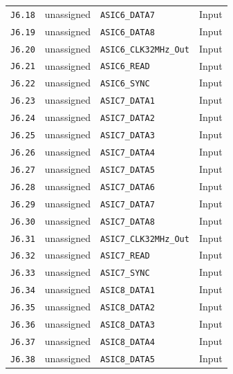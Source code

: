 \documentclass[11pt,a4paper]{article}
\begin{document}
\begin{longtable}{@{}P{19mm}P{36mm}P{78mm}P{33mm}@{}}
\nolinkurl{J6.18} & \textcolor{muted}{unassigned} & \nolinkurl{ASIC6_DATA7} & Input \\
\nolinkurl{J6.19} & \textcolor{muted}{unassigned} & \nolinkurl{ASIC6_DATA8} & Input \\
\nolinkurl{J6.20} & \textcolor{muted}{unassigned} & \nolinkurl{ASIC6_CLK32MHz_Out} & Input \\
\nolinkurl{J6.21} & \textcolor{muted}{unassigned} & \nolinkurl{ASIC6_READ} & Input \\
\nolinkurl{J6.22} & \textcolor{muted}{unassigned} & \nolinkurl{ASIC6_SYNC} & Input \\
\nolinkurl{J6.23} & \textcolor{muted}{unassigned} & \nolinkurl{ASIC7_DATA1} & Input \\
\nolinkurl{J6.24} & \textcolor{muted}{unassigned} & \nolinkurl{ASIC7_DATA2} & Input \\
\nolinkurl{J6.25} & \textcolor{muted}{unassigned} & \nolinkurl{ASIC7_DATA3} & Input \\
\nolinkurl{J6.26} & \textcolor{muted}{unassigned} & \nolinkurl{ASIC7_DATA4} & Input \\
\nolinkurl{J6.27} & \textcolor{muted}{unassigned} & \nolinkurl{ASIC7_DATA5} & Input \\
\nolinkurl{J6.28} & \textcolor{muted}{unassigned} & \nolinkurl{ASIC7_DATA6} & Input \\
\nolinkurl{J6.29} & \textcolor{muted}{unassigned} & \nolinkurl{ASIC7_DATA7} & Input \\
\nolinkurl{J6.30} & \textcolor{muted}{unassigned} & \nolinkurl{ASIC7_DATA8} & Input \\
\nolinkurl{J6.31} & \textcolor{muted}{unassigned} & \nolinkurl{ASIC7_CLK32MHz_Out} & Input \\
\nolinkurl{J6.32} & \textcolor{muted}{unassigned} & \nolinkurl{ASIC7_READ} & Input \\
\nolinkurl{J6.33} & \textcolor{muted}{unassigned} & \nolinkurl{ASIC7_SYNC} & Input \\
\nolinkurl{J6.34} & \textcolor{muted}{unassigned} & \nolinkurl{ASIC8_DATA1} & Input \\
\nolinkurl{J6.35} & \textcolor{muted}{unassigned} & \nolinkurl{ASIC8_DATA2} & Input \\
\nolinkurl{J6.36} & \textcolor{muted}{unassigned} & \nolinkurl{ASIC8_DATA3} & Input \\
\nolinkurl{J6.37} & \textcolor{muted}{unassigned} & \nolinkurl{ASIC8_DATA4} & Input \\
\nolinkurl{J6.38} & \textcolor{muted}{unassigned} & \nolinkurl{ASIC8_DATA5} & Input \\

\end{longtable}
\end{document}

